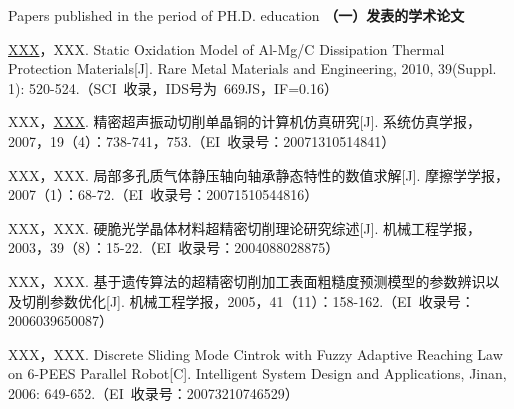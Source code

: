 
 {Papers
published in the period of PH.D. education}
\noindent\textbf{（一）发表的学术论文}
\begin{publist}
\item	\underline{XXX}，XXX. Static Oxidation Model of Al-Mg/C Dissipation Thermal Protection Materials[J]. Rare Metal Materials and Engineering, 2010, 39(Suppl. 1): 520-524.（SCI~收录，IDS号为~669JS，IF=0.16）
\item XXX，\underline{XXX}. 精密超声振动切削单晶铜的计算机仿真研究[J]. 系统仿真学报，2007，19（4）：738-741，753.（EI~收录号：20071310514841）
\item XXX，XXX. 局部多孔质气体静压轴向轴承静态特性的数值求解[J]. 摩擦学学报，2007（1）：68-72.（EI~收录号：20071510544816）
\item XXX，XXX. 硬脆光学晶体材料超精密切削理论研究综述[J]. 机械工程学报，2003，39（8）：15-22.（EI~收录号：2004088028875）
\item XXX，XXX. 基于遗传算法的超精密切削加工表面粗糙度预测模型的参数辨识以及切削参数优化[J]. 机械工程学报，2005，41（11）：158-162.（EI~收录号：2006039650087）
\item XXX，XXX. Discrete Sliding Mode Cintrok with Fuzzy Adaptive Reaching Law on 6-PEES Parallel Robot[C]. Intelligent System Design and Applications, Jinan, 2006: 649-652.（EI~收录号：20073210746529）
\end{publist}



